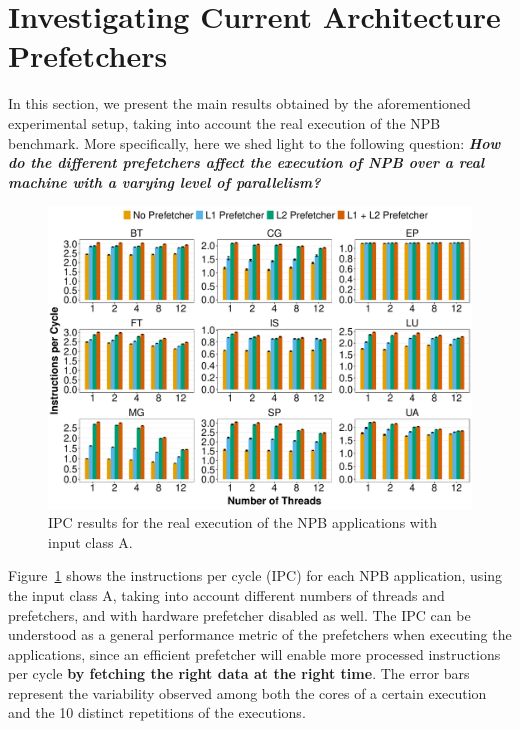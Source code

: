 \documentclass[AMA,final,STIX1COL]{WileyNJD-v2}
\newcommand\new[1]{{\color{red}\textbf{#1}}}
\begin{document}
\section{Investigating Current Architecture Prefetchers}\label{sec:real_ipc}

In this section, we present the main results obtained by the aforementioned experimental setup, taking into account the real execution of the NPB benchmark. 
More specifically, here we shed light to the following question: \new{\textit{How do the different prefetchers affect the execution of NPB over a real machine with a varying level of parallelism?}}


\begin{figure}[!htb]
    \centering
    \includegraphics[width=\linewidth]{figures/ipc-real.pdf}
    \caption{IPC results for the real execution of the NPB applications with input class A.}
    \label{fig:ipc}
    
\end{figure}


Figure~\ref{fig:ipc} shows the instructions per cycle (IPC) for each NPB application, using the input class A, taking into account different numbers of threads and prefetchers, and with hardware prefetcher disabled as well. 
The IPC can be understood as a general performance metric of the prefetchers when executing the applications, since an efficient prefetcher will enable more processed instructions per cycle \new{by fetching the right data at the right time}. 
The error bars represent the variability observed among both the cores of a certain execution and the 10 distinct repetitions of the executions.
\end{document}
